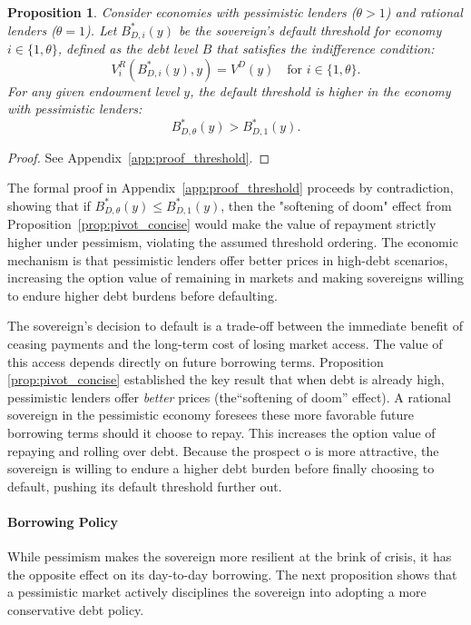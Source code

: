 \documentclass[12pt]{article}
\theoremstyle{plain}
\newtheorem{proposition}{Proposition}
\begin{document}
\begin{proposition}
	\label{prop:threshold}
	Consider economies with pessimistic lenders ($\theta > 1$) and rational lenders ($\theta = 1$). Let $B^*_{D,i}(y)$ be the sovereign's default threshold for economy $i \in \{1, \theta\}$, defined as the debt level $B$ that satisfies the indifference condition:
	\begin{equation}
		V^R_i(B^*_{D,i}(y),y) = V^D(y) \quad \text{for } i \in \{1, \theta\}.
		\label{eq:default_threshold_definition}
	\end{equation}
	For any given endowment level $y$, the default threshold is higher in the economy with pessimistic lenders:
	\begin{equation*}
		B^*_{D,\theta}(y) > B^*_{D,1}(y).
	\end{equation*}
\end{proposition}

\begin{proof}
	See Appendix~\ref{app:proof_threshold}.
\end{proof}
The formal proof in Appendix~\ref{app:proof_threshold} proceeds by contradiction, showing that if $B^*_{D,\theta}(y) \leq B^*_{D,1}(y)$, then the "softening of doom" effect from Proposition~\ref{prop:pivot_concise} would make the value of repayment strictly higher under pessimism, violating the assumed threshold ordering. The economic mechanism is that pessimistic lenders offer better prices in high-debt scenarios, increasing the option value of remaining in markets and making sovereigns willing to endure higher debt burdens before defaulting.

The sovereign's decision to default is a trade-off between the immediate
benefit of ceasing payments and the long-term cost of losing market access. The
value of this access depends directly on future borrowing terms. Proposition
\ref{prop:pivot_concise} established the key result that when debt is already
high, pessimistic lenders offer \textit{better} prices (the``softening of
doom'' effect). A rational sovereign in the pessimistic economy foresees these
more favorable future borrowing terms should it choose to repay. This increases
the option value of repaying and rolling over debt. Because the prospect o is
more attractive, the sovereign is willing to endure a higher debt burden before
finally choosing to default, pushing its default threshold further out.

\paragraph{Borrowing Policy}
While pessimism makes the sovereign more resilient at the brink of crisis, it
has the opposite effect on its day-to-day borrowing. The next proposition shows
that a pessimistic market actively disciplines the sovereign into adopting a
more conservative debt policy.
\end{document}
